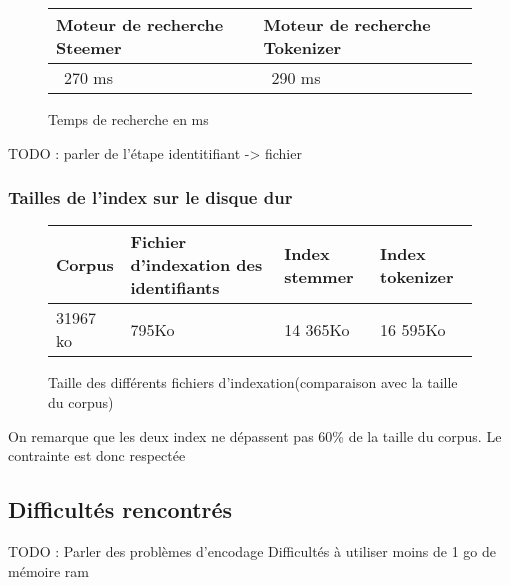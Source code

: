 \begin{figure}[H]
	\begin{tabular}{|l|l|}
		\hline
		Moteur de recherche Steemer & Moteur de recherche Tokenizer\\
		\hline
		~270 ms & ~290 ms \\
		\hline
	\end{tabular}
	\caption{Temps de recherche en ms}
	\label{tab:search_time}
\end{figure}

TODO : parler de l'étape identitifiant -> fichier

\subsubsection{Tailles de l'index sur le disque dur}
\begin{figure}[H]
	\begin{tabular}{|l|l|l|l|}
		\hline
		Corpus & Fichier d'indexation des identifiants & Index stemmer & Index tokenizer\\
		\hline
		31967 ko & 795Ko &  14 365Ko & 16 595Ko\\
		\hline
	\end{tabular}
	\caption{Taille des différents fichiers d'indexation(comparaison avec la taille du corpus)}
	\label{tab:indexation_space}
\end{figure}

On remarque que les deux index ne dépassent pas 60\% de la taille du corpus. Le contrainte est donc respectée


\subsection{Difficultés rencontrés}
TODO : 
Parler des problèmes d'encodage
Difficultés à utiliser moins de 1 go de mémoire ram


